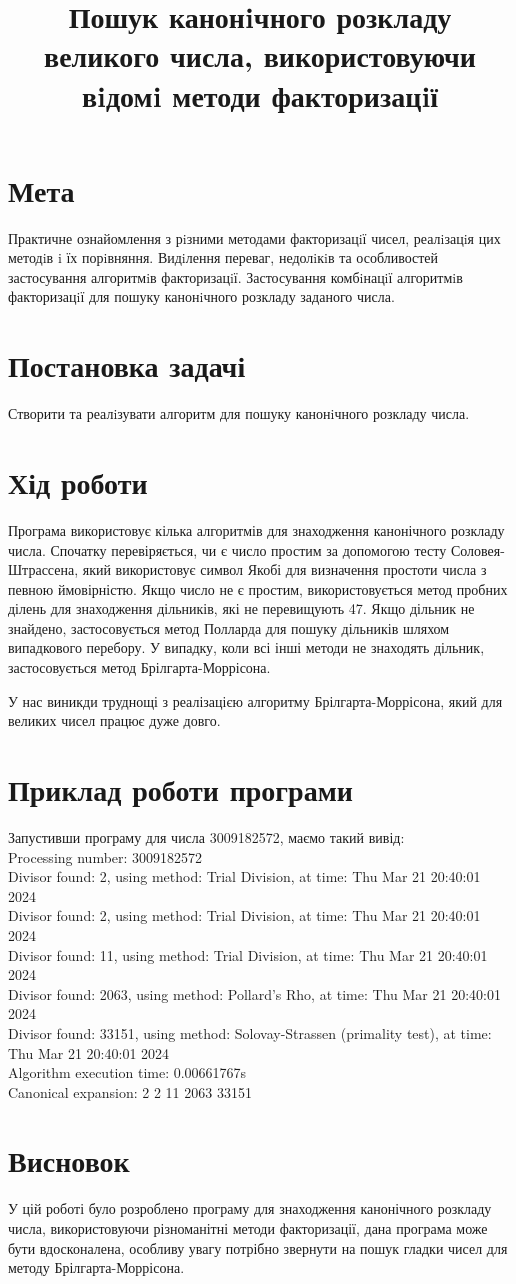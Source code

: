 \documentclass{article}
\title{Пошук канонiчного розкладу великого числа, використовуючи вiдомi методи факторизацiї}
\date{}
\begin{document}
\maketitle

\section{Мета}
\quad Практичне ознайомлення з рiзними методами факторизацiї чисел, реалiзацiя цих методiв i їх порiвняння. Видiлення переваг, недолiкiв та особливостей застосування алгоритмiв факторизацiї. Застосування комбiнацiї алгоритмiв факторизацiї для пошуку канонiчного розкладу заданого числа.

\section{Постановка задачі}
\quad Створити та реалiзувати алгоритм для пошуку канонiчного розкладу числа.

\section{Хід роботи}
\quad 
Програма використовує кілька алгоритмів для знаходження канонічного розкладу числа. Спочатку перевіряється, чи є число простим за допомогою тесту Соловея-Штрассена, який використовує символ Якобі для визначення простоти числа з певною ймовірністю. Якщо число не є простим, використовується метод пробних ділень для знаходження дільників, які не перевищують 47. Якщо дільник не знайдено, застосовується метод Полларда для пошуку дільників шляхом випадкового перебору. У випадку, коли всі інші методи не знаходять дільник, застосовується метод Брілгарта-Моррісона.

\quad 
У нас виникди труднощі з реалізацією алгоритму Брілгарта-Моррісона, який для великих чисел працює дуже довго.

\section{Приклад роботи програми}
\quad 
Запустивши програму для числа 3009182572, маємо такий вивід: \\
Processing number: 3009182572 \\
Divisor found: 2, using method: Trial Division, at time: Thu Mar 21 20:40:01 2024 \\
Divisor found: 2, using method: Trial Division, at time: Thu Mar 21 20:40:01 2024 \\
Divisor found: 11, using method: Trial Division, at time: Thu Mar 21 20:40:01 2024 \\
Divisor found: 2063, using method: Pollard's Rho, at time: Thu Mar 21 20:40:01 2024 \\
Divisor found: 33151, using method: Solovay-Strassen (primality test), at time: Thu Mar 21 20:40:01 2024 \\
Algorithm execution time: 0.00661767s \\
Canonical expansion: 2 2 11 2063 33151  \\


\section{Висновок}
\quad
У цій роботі було розроблено програму для знаходження канонічного розкладу числа, використовуючи різноманітні методи факторизації, дана програма може бути вдосконалена, особливу увагу потрібно звернути на пошук гладки чисел для методу Брілгарта-Моррісона.
\end{document}
